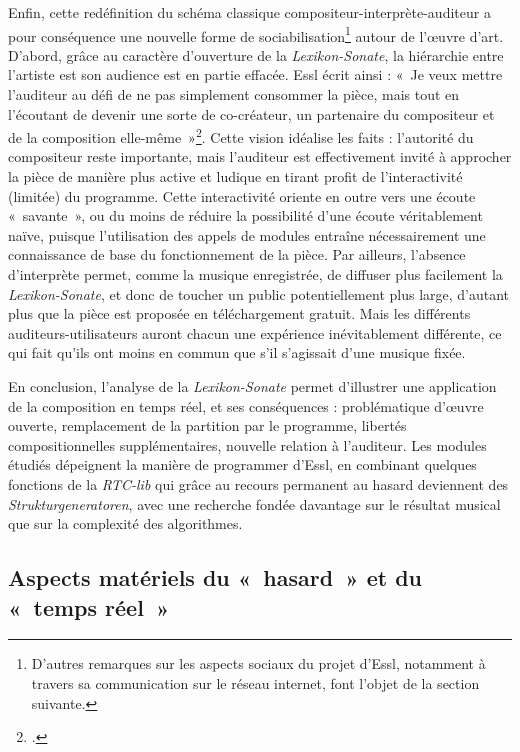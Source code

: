 \documentclass[a4paper,12pt]{article}
\newcommand{\guill}[1]{«~#1~»}
\begin{document}
Enfin, cette redéfinition du schéma classique compositeur-interprète-auditeur a pour conséquence une nouvelle forme de sociabilisation\footnote{D'autres remarques sur les aspects sociaux du projet d'Essl, notamment à travers sa communication sur le réseau internet, font l'objet de la section suivante.} autour de l'œuvre d'art. D'abord, grâce au caractère d'ouverture de la \emph{Lexikon-Sonate}, la hiérarchie entre l'artiste est son audience est en partie effacée. Essl écrit ainsi : \guill{Je veux mettre l'auditeur au défi de ne pas simplement consommer la pièce, mais tout en l'écoutant de devenir une sorte de co-créateur, un partenaire du compositeur et de la composition elle-même}\footnote{\cite{king}.}. Cette vision idéalise les faits : l'autorité du compositeur reste importante, mais l'auditeur est effectivement invité à approcher la pièce de manière plus active et ludique en tirant profit de l'interactivité (limitée) du programme. Cette interactivité oriente en outre vers une écoute \guill{savante}, ou du moins de réduire la possibilité d'une écoute véritablement naïve, puisque l'utilisation des appels de modules entraîne nécessairement une connaissance de base du fonctionnement de la pièce. Par ailleurs, l'absence d'interprète permet, comme la musique enregistrée, de diffuser plus facilement la \emph{Lexikon-Sonate}, et donc de toucher un public potentiellement plus large, d'autant plus que la pièce est proposée en téléchargement gratuit. Mais les différents auditeurs-utilisateurs auront chacun une expérience inévitablement différente, ce qui fait qu'ils ont moins en commun que s'il s'agissait d'une musique fixée.

En conclusion, l'analyse de la \emph{Lexikon-Sonate} permet d'illustrer une application de la composition en temps réel, et ses conséquences : problématique d'œuvre ouverte, remplacement de la partition par le programme, libertés compositionnelles supplémentaires, nouvelle relation à l'auditeur. Les modules étudiés dépeignent la manière de programmer d'Essl, en combinant quelques fonctions de la \emph{RTC-lib} qui grâce au recours permanent au hasard deviennent des \emph{Strukturgeneratoren}, avec une recherche fondée davantage sur le résultat musical que sur la complexité des algorithmes.


\subsection{Aspects matériels du \guill{hasard} et du \guill{temps réel}}
\label{aspectsmateriels}
\end{document}
